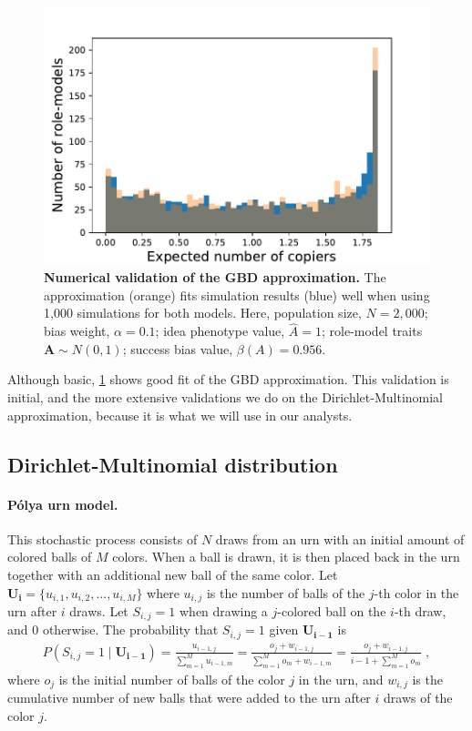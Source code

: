 \documentclass[12pt]{extarticle}
\let\vec\mathbf
\begin{document}
\begin{figure}[h]
    \includegraphics[width=0.7\linewidth]{../figures/final/GBD_validation.pdf}
  \caption{
  \textbf{Numerical validation of the GBD approximation.}
  The approximation (orange) fits simulation results (blue) well when using 1,000 simulations for both models.
  Here, population size, $N=2,000$; bias weight, $\alpha=0.1$; idea phenotype value, $\hat{A}=1$; role-model traits $\vec{A} \sim N(0,1)$; success bias value, $\beta(A)=0.956$.}	
  \label{fig:GBD}
\end{figure}

Although basic, \cref{fig:GBD} shows good fit of the GBD approximation.
This validation is initial, and the more extensive validations we do on the Dirichlet-Multinomial approximation, because it is what we will use in our analysts.

\subsection*{Dirichlet-Multinomial distribution}

\paragraph{P\'{o}lya urn model.}
This stochastic process consists of $N$ draws from an urn with an initial amount of colored balls of $M$ colors. When a ball is drawn, it is then placed back in the urn together with an additional new ball of the same color.
Let $\vec{U_i} = \{u_{i,1},u_{i,2},...,u_{i,M}\}$  where $u_{i,j}$ is the number of balls of the $j$-th color in the urn after $i$ draws.
Let $S_{i,j}=1$ when drawing a $j$-colored ball on the $i$-th draw, and $0$ otherwise. The probability that $S_{i,j}=1$ given $\vec{U_{i-1}}$ is
\begin{equation}\label{eq:polya}
\begin{split}
P(S_{i,j} = 1 \mid \vec{U_{i-1}}) = 
\frac{u_{i-1,j}}{\sum\limits_{m=1}^{M} u_{i-1,m}} = 
\frac{o_j + w_{i-1,j}}{\sum\limits_{m=1}^{M} o_m + w_{i-1,m}} = 
\frac{o_j + w_{i-1,j}}{i-1 + \sum\limits_{m=1}^{M} o_m} \;,
\end{split}
\end{equation}
where $o_j$ is the initial number of balls of the color $j$ in the urn, and $w_{i,j}$ is the cumulative number of new balls that were added to the urn after $i$ draws of the color $j$.
\\
\end{document}
